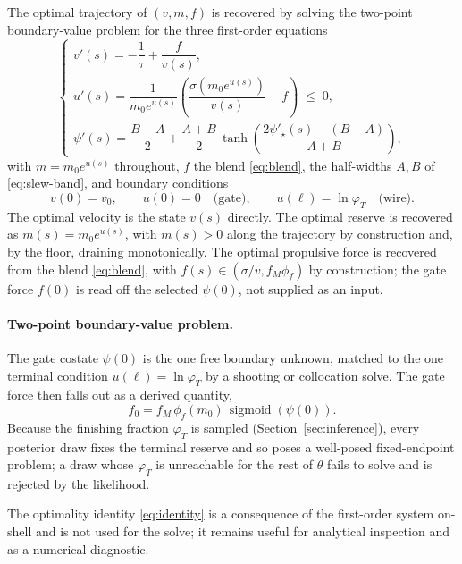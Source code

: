 \documentclass[11pt]{article}
\DeclareMathOperator{\sigmoid}{sigmoid}
\begin{document}
The optimal trajectory of $(v, m, f)$ is recovered by solving the two-point boundary-value problem for the three first-order equations
\begin{equation}
\begin{cases}
v'(s) = -\dfrac{1}{\tau} + \dfrac{f}{v(s)}, \\[2ex]
u'(s) = \dfrac{1}{m_0 e^{u(s)}}\left(\dfrac{\sigma(m_0 e^{u(s)})}{v(s)} - f\right) \;\leq\; 0, \\[2ex]
\psi'(s) = \dfrac{B - A}{2} + \dfrac{A + B}{2}\,\tanh\!\left(\dfrac{2\psi'_{\star}(s) - (B - A)}{A + B}\right),
\end{cases}
\end{equation}
with $m = m_0 e^{u(s)}$ throughout, $f$ the blend \eqref{eq:blend}, the half-widths $A, B$ of \eqref{eq:slew-band}, and boundary conditions
\[
v(0) = v_0, \qquad u(0) = 0 \quad \text{(gate)}, \qquad u(\ell) = \ln \varphi_T \quad \text{(wire)}.
\]
The optimal velocity is the state $v(s)$ directly. The optimal reserve is recovered as $m(s) = m_0 e^{u(s)}$, with $m(s) > 0$ along the trajectory by construction and, by the floor, draining monotonically. The optimal propulsive force is recovered from the blend \eqref{eq:blend}, with $f(s) \in (\sigma/v, f_M \phi_f)$ by construction; the gate force $f(0)$ is read off the selected $\psi(0)$, not supplied as an input.

\paragraph{Two-point boundary-value problem.} The gate costate $\psi(0)$ is the one free boundary unknown, matched to the one terminal condition $u(\ell) = \ln \varphi_T$ by a shooting or collocation solve. The gate force then falls out as a derived quantity,
\[
f_0 = f_M\, \phi_f(m_0)\, \sigmoid(\psi(0)).
\]
Because the finishing fraction $\varphi_T$ is sampled (Section~\ref{sec:inference}), every posterior draw fixes the terminal reserve and so poses a well-posed fixed-endpoint problem; a draw whose $\varphi_T$ is unreachable for the rest of $\theta$ fails to solve and is rejected by the likelihood.

The optimality identity \eqref{eq:identity} is a consequence of the first-order system on-shell and is not used for the solve; it remains useful for analytical inspection and as a numerical diagnostic.
\end{document}
